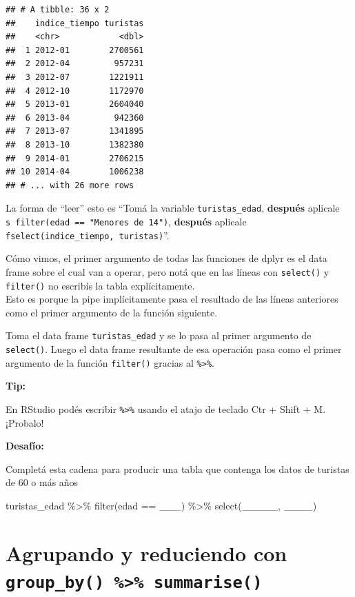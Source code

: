 \documentclass[
  openany]{book}
\newenvironment{Shaded}{\begin{snugshade}}{\end{snugshade}}
\newcommand{\FunctionTok}[1]{\textcolor[rgb]{0.00,0.00,0.00}{#1}}
\newcommand{\NormalTok}[1]{#1}
\newcommand{\SpecialCharTok}[1]{\textcolor[rgb]{0.00,0.00,0.00}{#1}}
\begin{document}
\begin{verbatim}
## # A tibble: 36 x 2
##    indice_tiempo turistas
##    <chr>            <dbl>
##  1 2012-01        2700561
##  2 2012-04         957231
##  3 2012-07        1221911
##  4 2012-10        1172970
##  5 2013-01        2604040
##  6 2013-04         942360
##  7 2013-07        1341895
##  8 2013-10        1382380
##  9 2014-01        2706215
## 10 2014-04        1006238
## # ... with 26 more rows
\end{verbatim}

La forma de ``leer'' esto es ``Tomá la variable \texttt{turistas\_edad}, \textbf{después} aplicale \texttt{s\ filter(edad\ ==\ "Menores\ de\ 14")}, \textbf{después} aplicale \texttt{fselect(indice\_tiempo,\ turistas)}''.

Cómo vimos, el primer argumento de todas las funciones de dplyr es el data frame sobre el cual van a operar, pero notá que en las líneas con \texttt{select()} y \texttt{filter()} no escribís la tabla explícitamente.\\
Esto es porque la pipe implícitamente pasa el resultado de las líneas anteriores como el primer argumento de la función siguiente.

Toma el data frame \texttt{turistas\_edad} y se lo pasa al primer argumento de \texttt{select()}.
Luego el data frame resultante de esa operación pasa como el primer argumento de la función \texttt{filter()} gracias al \texttt{\%\textgreater{}\%}.

\textbf{Tip:}

En RStudio podés escribir \texttt{\%\textgreater{}\%} usando el atajo de teclado Ctr + Shift + M.
¡Probalo!

\textbf{Desafío:}

Completá esta cadena para producir una tabla que contenga los datos de turistas de 60 o más años

\begin{Shaded}
\begin{Highlighting}[]
\NormalTok{turistas\_edad }\SpecialCharTok{\%\textgreater{}\%} 
  \FunctionTok{filter}\NormalTok{(edad }\SpecialCharTok{==}\NormalTok{ \_\_\_) }\SpecialCharTok{\%\textgreater{}\%} 
  \FunctionTok{select}\NormalTok{(\_\_\_\_\_, \_\_\_\_)}
\end{Highlighting}
\end{Shaded}

\hypertarget{agrupando-y-reduciendo-con-group_by-summarise}{%
\section{\texorpdfstring{Agrupando y reduciendo con \texttt{group\_by()\ \%\textgreater{}\%\ summarise()}}{Agrupando y reduciendo con group\_by() \%\textgreater\% summarise()}}\label{agrupando-y-reduciendo-con-group_by-summarise}}
\end{document}
